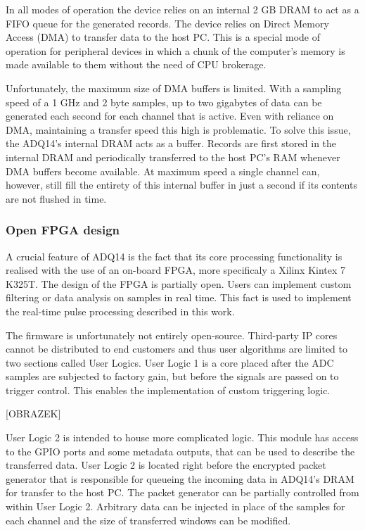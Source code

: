 In all modes of operation the device relies on an internal 2 GB DRAM
to act as a FIFO queue for the generated records.
The device relies on Direct Memory Access (DMA) to transfer
data to the host PC. This is a special mode of operation for 
peripheral devices in which a chunk of the computer's memory is
made available to them without the need of CPU brokerage.


Unfortunately, the maximum size of DMA buffers is limited. 
With a sampling speed of a 1 GHz and 2 byte samples, up 
to two gigabytes of data can be generated each second for each
channel that is active. Even with reliance on DMA, maintaining 
a transfer speed this high is problematic. To solve this issue, 
the ADQ14's internal DRAM acts as a buffer.
Records are first stored in the internal DRAM and periodically
transferred to the host PC's RAM whenever DMA buffers become available.
At maximum speed a single channel can, however, still fill the entirety
of this internal buffer in just a second if its contents are not flushed in time.

\subsubsection{Open FPGA design} \label{ssec:adq_devkit}

A crucial feature of ADQ14 is the fact that its core processing
functionality is realised with the use of an on-board FPGA,
more specificaly a Xilinx Kintex 7 K325T. The design of the FPGA
is partially open. Users can implement custom
filtering or data analysis on samples in real time.
This fact is used to implement the real-time pulse processing described in this work.


The firmware is unfortunately not entirely open-source.
Third-party IP cores cannot be distributed to end customers 
and thus user algorithms are limited to two sections called User Logics.
User Logic 1 is a core placed after the ADC samples are subjected to factory
gain, but before the signals are passed on to trigger control.
This enables the implementation of custom triggering logic.


{\Huge [OBRAZEK]}


User Logic 2 is intended to house more complicated logic.
This module has access to the GPIO ports and some metadata
outputs, that can be used to describe the transferred data.
User Logic 2 is located right before the encrypted packet generator
that is responsible for queueing the incoming data in ADQ14's DRAM 
for transfer to the host PC. The packet generator can be partially
controlled from within User Logic 2. Arbitrary data can be injected
in place of the samples for each channel and the size of transferred windows 
can be modified.


